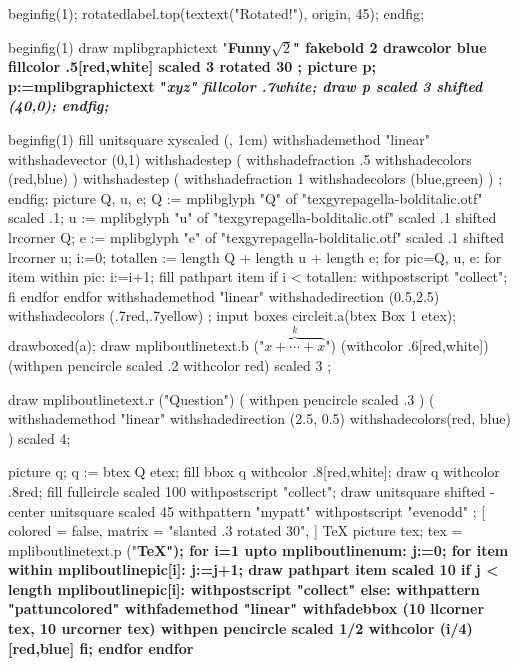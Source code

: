   beginfig(1);
    rotatedlabel.top(textext("Rotated!"), origin, 45);
  endfig;
\endmplibcode
\par
\mplibcode
beginfig(1) %
draw mplibgraphictext "\bf Funny$\sqrt{2}$"
  fakebold 2 %
  drawcolor blue fillcolor .5[red,white]
  scaled 3 rotated 30 ;
picture p;
p:=mplibgraphictext "\it xyz"
  fillcolor .7white;
draw p scaled 3 shifted (40,0);
endfig;
\endmplibcode
\par
{}%
\mplibcode
beginfig(1)
fill unitsquare xyscaled (\mpdim\hsize, 1cm)
    withshademethod "linear"
    withshadevector (0,1)
    withshadestep (
       withshadefraction .5
       withshadecolors (red,blue)
    )
    withshadestep (
       withshadefraction 1
       withshadecolors (blue,green)
    )
    ;
endfig;
\endmplibcode
\leavevmode
\mpfig
picture Q, u, e;
Q := mplibglyph "Q" of "texgyrepagella-bolditalic.otf" scaled .1;
u := mplibglyph "u" of "texgyrepagella-bolditalic.otf" scaled .1 shifted lrcorner Q;
e := mplibglyph "e" of "texgyrepagella-bolditalic.otf" scaled .1 shifted lrcorner u;
i:=0;
totallen := length Q + length u + length e;
for pic=Q, u, e:
  for item within pic:
    i:=i+1;
    fill pathpart item
    if i < totallen: withpostscript "collect"; fi
  endfor
endfor
  withshademethod "linear"
  withshadedirection (0.5,2.5)
  withshadecolors (.7red,.7yellow)
  ;
\endmpfig
{}%
\mpfig* input boxes \endmpfig
\mpfig circleit.a(btex Box 1 etex); drawboxed(a); \endmpfig
\def\mpfiginstancename{mympfig}%
\mpfig
draw mpliboutlinetext.b ("$\overbrace{x+\cdots+x}^k$")
    (withcolor .6[red,white])
    (withpen pencircle scaled .2 withcolor red)
    scaled 3 ;
\endmpfig
\par
\mpfig
  draw mpliboutlinetext.r
    ("Question")
    ( withpen pencircle scaled .3 )
    (
      withshademethod "linear"
      withshadedirection (2.5, 0.5)
      withshadecolors(red, blue)
    )
    scaled 4;
\endmpfig
\par\leavevmode
{}
  \mpfig
    picture q;
    q := btex Q etex;
    fill bbox q withcolor .8[red,white];
    draw q withcolor .8red;
  \endmpfig
\endmppattern
\mpfig
  fill fullcircle scaled 100 withpostscript "collect";
  draw unitsquare shifted - center unitsquare scaled 45
    withpattern "mypatt"
    withpostscript "evenodd"
    ;
\endmpfig
{}
  [
    colored = false,
    matrix = "slanted .3 rotated 30",
  ]
  \fiverm\TeX
\endmppattern
\mpfig
  picture tex;
  tex = mpliboutlinetext.p ("\bf \TeX");
  for i=1 upto mpliboutlinenum:
    j:=0;
    for item within mpliboutlinepic[i]:
      j:=j+1;
      draw pathpart item scaled 10
      if j < length mpliboutlinepic[i]:
          withpostscript "collect"
      else:
          withpattern "pattuncolored"
          withfademethod "linear"
          withfadebbox (10 llcorner tex, 10 urcorner tex)
          withpen pencircle scaled 1/2
          withcolor (i/4)[red,blue]
      fi;
    endfor
  endfor
\endmpfig
{}

